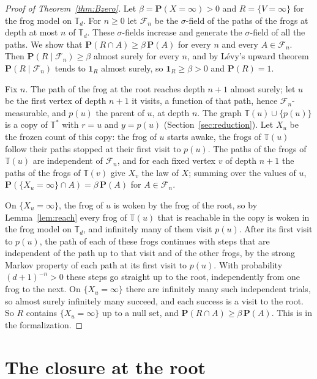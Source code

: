 \documentclass[11pt]{amsart}
\theoremstyle{definition}
\numberwithin{equation}{section}
\newcommand{\T}{\mathbb{T}}
\newcommand{\Ts}{\mathbb{T}^{*}}
\renewcommand{\P}{\mathbf{P}}
\newcommand{\one}{\mathbf{1}}
\begin{document}
\begin{proof}[Proof of Theorem~\ref{thm:Bzero}]
Let $\beta=\P(X=\infty)>0$ and $R=\{V=\infty\}$ for the frog model on $\T_d$. For $n\ge0$ let $\mathcal F_n$ be the $\sigma$-field of the paths of the frogs at depth at most $n$ of $\T_d$. These $\sigma$-fields increase and generate the $\sigma$-field of all the paths. We show that $\P(R\cap A)\ge\beta\,\P(A)$ for every $n$ and every $A\in\mathcal F_n$. Then $\P(R\mid\mathcal F_n)\ge\beta$ almost surely for every $n$, and by L\'evy's upward theorem $\P(R\mid\mathcal F_n)$ tends to $\one_R$ almost surely, so $\one_R\ge\beta>0$ and $\P(R)=1$.

Fix $n$. The path of the frog at the root reaches depth $n+1$ almost surely; let $u$ be the first vertex of depth $n+1$ it visits, a function of that path, hence $\mathcal F_n$-measurable, and $p(u)$ the parent of $u$, at depth $n$. The graph $\T(u)\cup\{p(u)\}$ is a copy of $\Ts$ with $r=u$ and $y=p(u)$ (Section~\ref{sec:reduction}). Let $X_u$ be the frozen count of this copy: the frog of $u$ starts awake, the frogs of $\T(u)$ follow their paths stopped at their first visit to $p(u)$. The paths of the frogs of $\T(u)$ are independent of $\mathcal F_n$, and for each fixed vertex $v$ of depth $n+1$ the paths of the frogs of $\T(v)$ give $X_v$ the law of $X$; summing over the values of $u$, $\P(\{X_u=\infty\}\cap A)=\beta\,\P(A)$ for $A\in\mathcal F_n$.

On $\{X_u=\infty\}$, the frog of $u$ is woken by the frog of the root, so by Lemma~\ref{lem:reach} every frog of $\T(u)$ that is reachable in the copy is woken in the frog model on $\T_d$, and infinitely many of them visit $p(u)$. After its first visit to $p(u)$, the path of each of these frogs continues with steps that are independent of the path up to that visit and of the other frogs, by the strong Markov property of each path at its first visit to $p(u)$. With probability $(d+1)^{-n}>0$ these steps go straight up to the root, independently from one frog to the next. On $\{X_u=\infty\}$ there are infinitely many such independent trials, so almost surely infinitely many succeed, and each success is a visit to the root. So $R$ contains $\{X_u=\infty\}$ up to a null set, and $\P(R\cap A)\ge\beta\,\P(A)$. This is  in the formalization.
\end{proof}

\section{The closure at the root}\label{sec:closure}
\end{document}
